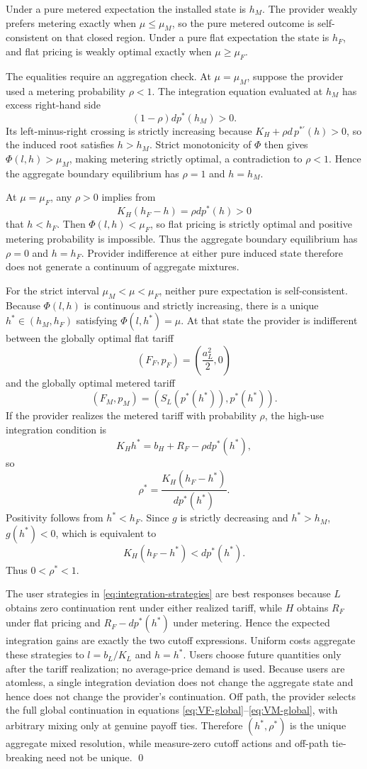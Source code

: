 Under a pure metered expectation the installed state is $h_M$. The provider weakly prefers metering exactly when $\mu\leq\mu_M$, so the pure metered outcome is self-consistent on that closed region. Under a pure flat expectation the state is $h_F$, and flat pricing is weakly optimal exactly when $\mu\geq\mu_F$.

The equalities require an aggregation check. At $\mu=\mu_M$, suppose the provider used a metering probability $\rho<1$. The integration equation evaluated at $h_M$ has excess right-hand side
\[
 (1-\rho)d p^*(h_M)>0.
\]
Its left-minus-right crossing is strictly increasing because $K_H+\rho d\,p^{*\prime}(h)>0$, so the induced root satisfies $h>h_M$. Strict monotonicity of $\Phi$ then gives $\Phi(l,h)>\mu_M$, making metering strictly optimal, a contradiction to $\rho<1$. Hence the aggregate boundary equilibrium has $\rho=1$ and $h=h_M$.

At $\mu=\mu_F$, any $\rho>0$ implies from
\[
 K_H(h_F-h)=\rho d p^*(h)>0
\]
that $h<h_F$. Then $\Phi(l,h)<\mu_F$, so flat pricing is strictly optimal and positive metering probability is impossible. Thus the aggregate boundary equilibrium has $\rho=0$ and $h=h_F$. Provider indifference at either pure induced state therefore does not generate a continuum of aggregate mixtures.

For the strict interval $\mu_M<\mu<\mu_F$, neither pure expectation is self-consistent. Because $\Phi(l,h)$ is continuous and strictly increasing, there is a unique $h^*\in(h_M,h_F)$ satisfying $\Phi(l,h^*)=\mu$. At that state the provider is indifferent between the globally optimal flat tariff
\[
 (F_F,p_F)=\left(\frac{a_L^2}{2},0\right)
\]
and the globally optimal metered tariff
\[
 (F_M,p_M)=\left(S_L(p^*(h^*)),p^*(h^*)\right).
\]
If the provider realizes the metered tariff with probability $\rho$, the high-use integration condition is
\[
K_Hh^*=b_H+R_F-\rho d p^*(h^*),
\]
so
\[
\rho^*=\frac{K_H(h_F-h^*)}{d p^*(h^*)}.
\]
Positivity follows from $h^*<h_F$. Since $g$ is strictly decreasing and $h^*>h_M$, $g(h^*)<0$, which is equivalent to
\[
K_H(h_F-h^*)<d p^*(h^*).
\]
Thus $0<\rho^*<1$.

The user strategies in \eqref{eq:integration-strategies} are best responses because $L$ obtains zero continuation rent under either realized tariff, while $H$ obtains $R_F$ under flat pricing and $R_F-dp^*(h^*)$ under metering. Hence the expected integration gains are exactly the two cutoff expressions. Uniform costs aggregate these strategies to $l=b_L/K_L$ and $h=h^*$. Users choose future quantities only after the tariff realization; no average-price demand is used. Because users are atomless, a single integration deviation does not change the aggregate state and hence does not change the provider's continuation. Off path, the provider selects the full global continuation in equations \eqref{eq:VF-global}--\eqref{eq:VM-global}, with arbitrary mixing only at genuine payoff ties. Therefore $(h^*,\rho^*)$ is the unique aggregate mixed resolution, while measure-zero cutoff actions and off-path tie-breaking need not be unique. \qed

